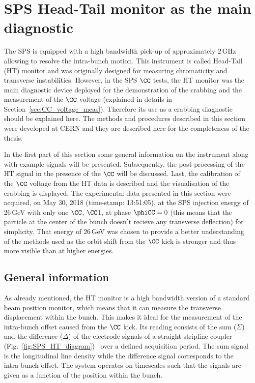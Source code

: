 \section{SPS Head-Tail monitor as the main diagnostic}\label{sec:HT_info}

The SPS is equipped with a high bandwidth pick-up of approximately 2\,GHz allowing to resolve the intra-bunch motion. This instrument is called Head-Tail (HT) monitor and was originally designed for measuring chromaticity and transverse instabilities. However, in the SPS $\CC$ tests, the HT monitor was the main diagnostic device deployed for the demonstration of the crabbing and the measurement of the $\CC$ voltage (explained in details in Section~\ref{sec:CC_voltage_meas}). Therefore its use as a crabbing diagnostic should be explained here. The methods and procedures described in this section were developed at CERN and they are described here for the completeness of the thesis.

 In the first part of this section some general information on the instrument along with example signals will be presented. Subsequently, the post processing of the HT signal in the presence of the $\CC$ will be discussed. Last, the calibration of the $\CC$ voltage from the HT data is described and the visualisation of the crabbing is displayed. The experimental data presented in this section were acquired, on May 30, 2018 (time-stamp: 13:51:05), at the SPS injection energy of 26\,GeV with only one $\CC$, $\CC$1, at phase $\phiCC=0$ (this means that the particle at the center of the bunch doesn't recieve any transverse deflection) for simplicity. That energy of 26\,GeV was chosen to provide a better understanding of the methods used as the orbit shift from the $\CC$ kick is stronger and thus more visible than at higher energies.

\subsection{General information}\label{subsec:HT_general_info}
As already mentioned, the HT monitor is a high bandwidth version of a standard beam position monitor, which means that it can measure the transverse displacement within the bunch. This makes it ideal for the measurement of the intra-bunch offset caused from the $\CC$ kick. Its reading consists of the sum ($\Sigma$) and the  difference ($\Delta$) of the electrode signals of a straight stripline coupler (Fig.~\ref{fig:SPS_HT_diagram})~\cite{Jones:987561, Levens:2313358} over a defined acquisition period. The sum signal is the longitudinal line density while the difference signal corresponds to the intra-bunch offset. The system operates on timescales such that the signals are given as a function of the position within the bunch.

